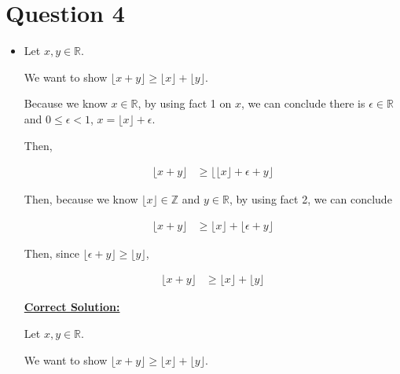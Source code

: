 \documentclass[12pt]{article}
\begin{document}
\section*{Question 4}
\begin{itemize}
    \item

    Let $x,y \in \mathbb{R}$.

    \bigskip

    We want to show $\lfloor x + y \rfloor \geq \lfloor x \rfloor + \lfloor y \rfloor$.

    \bigskip

    Because we know $x \in \mathbb{R}$, by using fact 1 on $x$, we can conclude there
    is $\epsilon \in \mathbb{R}$ and $0 \leq \epsilon < 1$, $x = \lfloor x \rfloor + \epsilon$.

    \bigskip

    Then,

    \setcounter{equation}{0}
    \begin{align}
        \lfloor x + y \rfloor &\geq \bigl\lfloor \lfloor x \rfloor + \epsilon + y \bigr\rfloor
    \end{align}

    \bigskip

    Then, because we know $\lfloor x \rfloor \in \mathbb{Z}$ and $y \in \mathbb{R}$,
    by using fact 2, we can conclude

    \begin{align}
        \lfloor x + y \rfloor &\geq \lfloor x \rfloor + \lfloor \epsilon + y \rfloor
    \end{align}

    \bigskip

    Then, since $\lfloor \epsilon + y \rfloor \geq \lfloor y \rfloor$,

    \begin{align}
        \lfloor x + y \rfloor &\geq \lfloor x \rfloor + \lfloor y \rfloor
    \end{align}

    \begin{mdframed}
        \underline{\textbf{Correct Solution:}}

        \bigskip

        Let $x,y \in \mathbb{R}$.

        \bigskip

        We want to show $\lfloor x + y \rfloor \geq \lfloor x \rfloor + \lfloor y \rfloor$.

        \bigskip


\end{mdframed}
\end{itemize}
\end{document}
